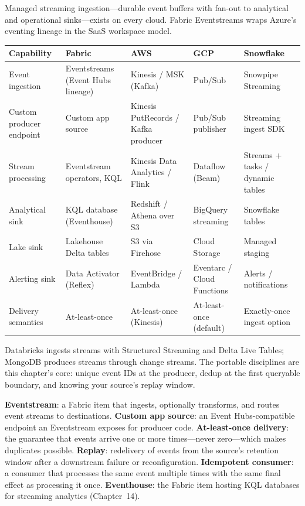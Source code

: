 \begin{crosscloud}
Managed streaming ingestion---durable event buffers with fan-out to analytical and operational sinks---exists on every cloud. Fabric Eventstreams wraps Azure's eventing lineage in the SaaS workspace model.

\vspace{2mm}
{\footnotesize
\begin{tabular}{@{}p{2.8cm}p{3.2cm}p{3.2cm}p{3.2cm}p{3.2cm}@{}}
\toprule
\textbf{Capability} & \textbf{Fabric} & \textbf{AWS} & \textbf{GCP} & \textbf{Snowflake} \\
\midrule
Event ingestion & Eventstreams (Event Hubs lineage) & Kinesis / MSK (Kafka) & Pub/Sub & Snowpipe Streaming \\
Custom producer endpoint & Custom app source & Kinesis PutRecords / Kafka producer & Pub/Sub publisher & Streaming ingest SDK \\
Stream processing & Eventstream operators, KQL & Kinesis Data Analytics / Flink & Dataflow (Beam) & Streams + tasks / dynamic tables \\
Analytical sink & KQL database (Eventhouse) & Redshift / Athena over S3 & BigQuery streaming & Snowflake tables \\
Lake sink & Lakehouse Delta tables & S3 via Firehose & Cloud Storage & Managed staging \\
Alerting sink & Data Activator (Reflex) & EventBridge / Lambda & Eventarc / Cloud Functions & Alerts / notifications \\
Delivery semantics & At-least-once & At-least-once (Kinesis) & At-least-once (default) & Exactly-once ingest option \\
\bottomrule
\end{tabular}}

\vspace{1mm}
Databricks ingests streams with Structured Streaming and Delta Live Tables; MongoDB produces streams through change streams. The portable disciplines are this chapter's core: unique event IDs at the producer, dedup at the first queryable boundary, and knowing your source's replay window.
\end{crosscloud}

\begin{keyterms}
\textbf{Eventstream}: a Fabric item that ingests, optionally transforms, and routes event streams to destinations. \quad
\textbf{Custom app source}: an Event Hubs-compatible endpoint an Eventstream exposes for producer code. \quad
\textbf{At-least-once delivery}: the guarantee that events arrive one or more times---never zero---which makes duplicates possible. \quad
\textbf{Replay}: redelivery of events from the source's retention window after a downstream failure or reconfiguration. \quad
\textbf{Idempotent consumer}: a consumer that processes the same event multiple times with the same final effect as processing it once. \quad
\textbf{Eventhouse}: the Fabric item hosting KQL databases for streaming analytics (Chapter~14).
\end{keyterms}

